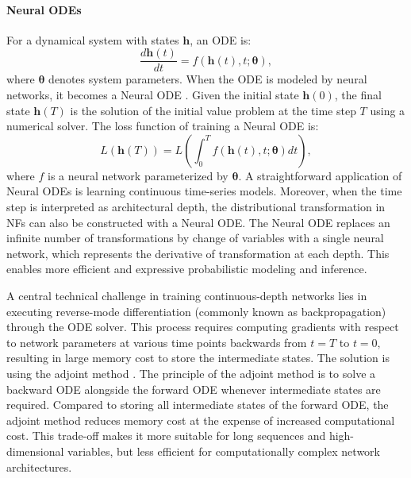 \paragraph{Neural \acp{ODE}}
For a dynamical system with states $\boldsymbol{h}$, an \ac{ODE} is:
\begin{equation}
    \frac{d\boldsymbol{h}(t)}{dt} = f(\boldsymbol{h}(t), t; \boldsymbol{\theta}),
\end{equation}
where $\boldsymbol{\theta}$ denotes system parameters. When the \ac{ODE} is modeled by neural networks, it becomes a Neural \ac{ODE} \citep{chen2019node}. Given the initial state $\boldsymbol{h}(0)$, the final state $\boldsymbol{h}(T)$ is the solution of the initial value problem at the time step $T$ using a numerical solver. The loss function of training a Neural \ac{ODE} is:
\begin{equation}
    L(\boldsymbol{h}(T))=L(\int_0^Tf(\boldsymbol{h}(t), t; \boldsymbol{\theta})dt),
\end{equation}
where $f$ is a neural network parameterized by $\boldsymbol{\theta}$.
A straightforward application of Neural \acp{ODE} is learning continuous time-series models. Moreover, when the time step is interpreted as architectural depth, the distributional transformation in \acp{NF} can also be constructed with a Neural \ac{ODE}. The Neural \ac{ODE} replaces an infinite number of transformations by change of variables with a single neural network, which represents the derivative of transformation at each depth. This enables more efficient and expressive probabilistic modeling and inference.

A central technical challenge in training continuous-depth networks lies in executing reverse-mode differentiation (commonly known as backpropagation) through the ODE solver. This process requires computing gradients with respect to network parameters at various time points backwards from $t=T$ to $t=0$, resulting in large memory cost to store the intermediate states. The solution is using the adjoint method \citep{Bittner1963, adjoint1963}. The principle of the adjoint method is to solve a backward \ac{ODE} alongside the forward \ac{ODE} whenever intermediate states are required. Compared to storing all intermediate states of the forward \ac{ODE}, the adjoint method reduces memory cost at the expense of increased computational cost. This trade-off makes it more suitable for long sequences and high-dimensional variables, but less efficient for computationally complex network architectures.

